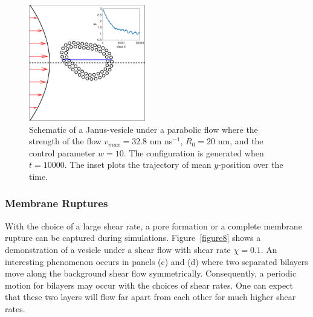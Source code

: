 \documentclass[lineno]{jfm}
\begin{document}
\begin{figure}
\centering
\includegraphics[height=2in]{parabolic.eps}
  \caption{Schematic of a Janus-vesicle under a parabolic flow where the strength of the flow $v_{max}=32.8$ nm ns$^{-1}$, $R_0 = 20$ nm,  and the control parameter $w=10$. The configuration is generated when $t=10000$. The inset plots the trajectory of mean $y$-position over the time.
  }
    \label{figure7}
\end{figure}




\subsubsection{Membrane Ruptures}


With the choice of a large shear rate, a pore formation or a complete membrane rupture can be captured during simulations. Figure~\ref{figure8} shows a demonstration of a vesicle under a shear flow with shear rate $\chi=0.1$. An interesting phenomenon occurs in panels (c) and (d) where two separated bilayers move along the background shear flow symmetrically. Consequently, a periodic motion for bilayers may occur 
with the choices of shear rates. One can expect that these two layers will flow far apart from each other for much higher shear rates.
\end{document}
